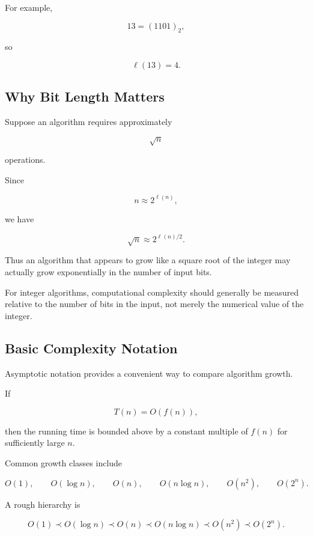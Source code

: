 For example,

\[ 13=(1101)_2, \]

so

\[ \ell(13)=4. \]

\subsection{Why Bit Length Matters}
\label{subsec:why-bit-length-matters}

Suppose an algorithm requires approximately

\[ \sqrt n \]

operations.

Since

\[ n\approx2^{\ell(n)}, \]

we have

\[ \sqrt n\approx2^{\ell(n)/2}. \]

Thus an algorithm that appears to grow like a square root of the integer may
actually grow exponentially in the number of input bits.

\begin{importantbox}
For integer algorithms, computational complexity should generally be measured
relative to the number of bits in the input, not merely the numerical value
of the integer.
\end{importantbox}

\subsection{Basic Complexity Notation}
\label{subsec:number-theory-complexity-notation}

Asymptotic notation provides a convenient way to compare algorithm growth.

If

\[ T(n)=O(f(n)), \]

then the running time is bounded above by a constant multiple of \(f(n)\) for
sufficiently large \(n\).

Common growth classes include

\[
O(1),\qquad O(\log n),\qquad O(n),\qquad O(n\log n),\qquad O(n^2),
\qquad O(2^n).
\]

A rough hierarchy is

\[
O(1)
\prec
O(\log n)
\prec
O(n)
\prec
O(n\log n)
\prec
O(n^2)
\prec
O(2^n).
\]

